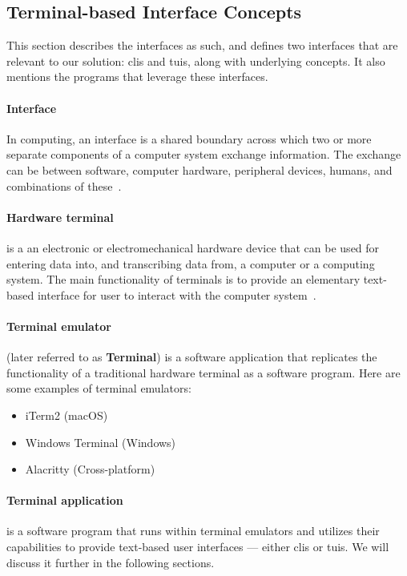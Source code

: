 \subsection{Terminal-based Interface Concepts}

This section describes the interfaces as such, and defines two interfaces that
are relevant to our solution: \glspl{cli} and \glspl{tui}, along with underlying
concepts. It also mentions the programs that leverage these interfaces.

\paragraph{Interface}
In computing, an interface is a shared boundary across which two or more
separate components of a computer system exchange information. The exchange can
be between software, computer hardware, peripheral devices, humans, and
combinations of these~\cite{hookway2014}.

\paragraph{Hardware terminal}
is a an electronic or electromechanical hardware device that can be used for
entering data into, and transcribing data from, a computer or a computing
system. The main functionality of terminals is to provide an elementary
text-based interface for user to interact with the computer
system~\cite{terminfo}.

\paragraph{Terminal emulator}
(later referred to as \textbf{Terminal})
is a software application that replicates the functionality of a traditional
hardware terminal as a software program. Here are some examples of terminal
emulators:
\begin{itemize}
  \item iTerm2 (macOS)
  \item Windows Terminal (Windows)
  \item Alacritty (Cross-platform)
\end{itemize}

\paragraph{Terminal application}
is a software program that runs within terminal emulators and utilizes their
capabilities to provide text-based user interfaces --- either \glspl{cli} or
\glspl{tui}. We will discuss it further in the following sections.

